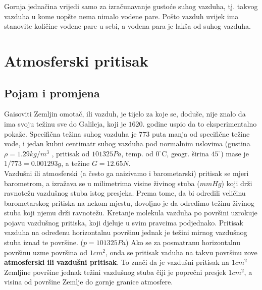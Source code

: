 Gornja jednačina vrijedi samo za izračunavanje gustoće suhog vazduha, tj. takvog vazduha u kome uopšte nema nimalo vodene pare. Pošto vazduh uvijek ima stanovite količine vodene pare u sebi, a vodena para je lakša od suhog vazduha.
\section{Atmosferski pritisak}

	\subsection{Pojam i promjena}
	Gaisoviti Zemljin omotač, ili vazduh, je tijelo za koje se, doduše, nije znalo da ima svoju težinu sve do Galileja, koji je $1620.$ godine uspio da to eksperimentalno pokaže. Specifična težina suhog vazduha je $773$ puta manja od specifične težine vode, i jedan kubni centimatr suhog vazduha pod normalnim uslovima (gustina $ \rho =1.29 kg/m^{3} $ , pritisak od  $101325Pa$, temp. od $ 0^\circ$C, geogr. širina $ 45 ^\circ$) mase je $ 1/773 = 0.001293g$, a težine $ G=12.65N $.\\
	Vazdušni ili atmosferski (a često ga naizivamo i barometarski) pritisak se mjeri barometrom, a izražava se u milimetrima visine živinog stuba ($mm Hg$)  koji drži ravnotežu vazdušnog stuba istog presjeka. Prema tome, da bi odredili veličinu barometarskog pritiska na nekom mjestu, dovoljno je da odredimo težinu živinog stuba koji njemu drži ravnotežu. Kretanje molekula vazduha po površini uzrokuje pojavu vazdušnog pritiska, koji djeluje u svim pravcima podjednako.
	Pritisak vazduha na određenu horizontalnu površinu jednak je težini mirnog vazdušnog stuba iznad te površine. ($p=101325Pa$)
	Ako se za posmatranu horizontalnu površinu uzme površina od $1cm^{2}$, onda se pritisak vaduha na takvu površinu zove \textbf{atmosferski ili vazdušni pritisak}.
	To znači da je vazdušni pritisak na $1cm^{2}$ Zemljine površine jednak težini vazdušnog stuba čiji je poprečni presjek  $1cm^{2}$, a visina od površine Zemlje do gornje granice atmosfere.
	
